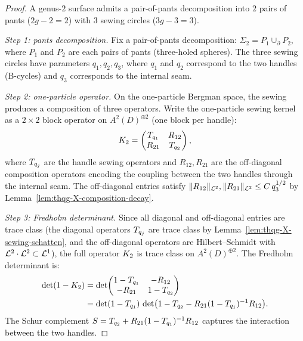 \begin{proof}
A genus-$2$ surface admits a pair-of-pants decomposition into
$2$ pairs of pants ($2g-2 = 2$) with $3$ sewing circles
($3g-3 = 3$).

\emph{Step 1: pants decomposition.}
Fix a pair-of-pants decomposition: $\Sigma_2 = P_1 \cup_{\partial} P_2$,
where $P_1$ and $P_2$ are each pairs of pants (three-holed spheres).
The three sewing circles have parameters $q_1, q_2, q_3$, where
$q_1$ and $q_2$ correspond to the two handles (B-cycles) and
$q_3$ corresponds to the internal seam.

\emph{Step 2: one-particle operator.}
On the one-particle Bergman space, the sewing produces a
composition of three operators. Write the one-particle sewing
kernel as a $2 \times 2$ block operator on
$A^2(D)^{\oplus 2}$ (one block per handle):
\begin{equation}\label{eq:thqg-X-genus-2-block}
K_2
=
\begin{pmatrix}
T_{q_1} & R_{12} \\
R_{21} & T_{q_2}
\end{pmatrix},
\end{equation}
where $T_{q_j}$ are the handle sewing operators and
$R_{12}, R_{21}$ are the off-diagonal composition operators
encoding the coupling between the two handles through the internal
seam. The off-diagonal entries satisfy
$\|R_{12}\|_{\mathcal{L}^2}, \|R_{21}\|_{\mathcal{L}^2} \leq C\,q_3^{1/2}$
by Lemma~\ref{lem:thqg-X-composition-decay}.

\emph{Step 3: Fredholm determinant.}
Since all diagonal and off-diagonal entries are trace class
(the diagonal operators $T_{q_j}$ are trace class by
Lemma~\ref{lem:thqg-X-sewing-schatten}, and the off-diagonal
operators are Hilbert--Schmidt with $\mathcal{L}^2 \cdot \mathcal{L}^2 \subset \mathcal{L}^1$),
the full operator $K_2$ is trace class on
$A^2(D)^{\oplus 2}$. The Fredholm determinant is:
\begin{align}
\det(1 - K_2)
&= \det\!\begin{pmatrix}
1 - T_{q_1} & -R_{12} \\
-R_{21} & 1 - T_{q_2}
\end{pmatrix}
\notag\\
&= \det(1 - T_{q_1})\,
\det\bigl(1 - T_{q_2}
- R_{21}(1-T_{q_1})^{-1}R_{12}\bigr).
\label{eq:thqg-X-genus-2-schur}
\end{align}
The Schur complement
$S = T_{q_2} + R_{21}(1-T_{q_1})^{-1}R_{12}$
captures the interaction between the two handles.


\end{proof}
